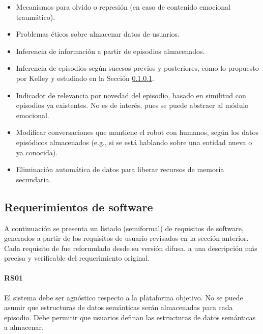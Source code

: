 \begin{itemize}
\item Mecanismos para olvido o represión (en caso de contenido emocional traumático).
\item Problemas éticos sobre almacenar datos de usuarios.
\item Inferencia de información a partir de episodios almacenados.
\item Inferencia de episodios según sucesos previos y posteriores, como lo propuesto por Kelley \cite{Kelley2014} y estudiado en la Sección \ref{}.
\item Indicador de relevancia por novedad del episodio, basado en similitud con episodios ya existentes. No es de interés, pues se puede abstraer al módulo emocional.
\item Modificar conversaciones que mantiene el robot con humanos, según los datos episódicos almacenados (e.g., si se está hablando sobre una entidad nueva o ya conocida).
\item Eliminación automática de datos para liberar recursos de memoria secundaria.
\end{itemize}



\subsection{Requerimientos de software}

A continuación se presenta un listado (semiformal) de requisitos de software, generados a partir de los requisitos de usuario revisados en la sección anterior. Cada requisito de fue reformulado desde su versión difusa, a una descripción más precisa y verificable del requerimiento original. 

\paragraph{RS01}
El sistema debe ser agnóstico respecto a la plataforma objetivo. No se puede asumir que estructuras de datos semánticas serán almacenadas para cada episodio. Debe permitir que usuarios definan las estructuras de datos semánticas a almacenar.

